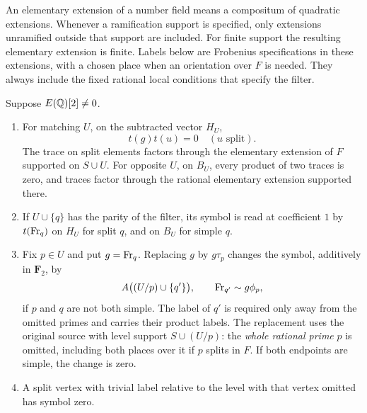 An elementary extension of a number field means a compositum of
quadratic extensions.  Whenever a ramification support is specified,
only extensions unramified outside that support are included.  For
finite support the resulting elementary extension is finite.  Labels
below are Frobenius specifications in these extensions, with a chosen
place when an orientation over $F$ is needed.  They always include the
fixed rational local conditions that specify the filter.

\begin{proposition}
\label{tc:rational-rules}
Suppose $E(\mathbb Q)[2]\ne0$.
\begin{enumerate}[label=\textup{(\roman*)}]
\item For matching $U$, on the subtracted vector $H_U$,
\[
                         t(g)t(u)=0\quad(u\text{ split}).
\]
The trace on split elements factors through the elementary extension
of $F$ supported on $S\cup U$.  For opposite $U$, on $B_U$, every
product of two traces is zero, and traces factor through the rational
elementary extension supported there.
\item If $U\cup\{q\}$ has the parity of the filter, its symbol is
read at coefficient $1$ by $t(\operatorname{Fr}_q)$ on $H_U$ for split $q$, and on
$B_U$ for simple $q$.
\item Fix $p\in U$ and put $g=\operatorname{Fr}_q$.  Replacing $g$ by $g\tau_p$
changes the symbol, additively in $\mathbf F_2$, by
\begin{equation}
                  A\bigl((U/p)\cup\{q'\}\bigr),
       \qquad \operatorname{Fr}_{q'}\sim g\phi_p,
 \label{tc:rational-contraction}
\end{equation}
if $p$ and $q$ are not both simple.  The label of $q'$ is required
only away from the omitted primes and carries their product labels.
The replacement uses the original source with level support
$S\cup(U/p)$: the \emph{whole rational prime} $p$ is omitted,
including both places over it if $p$ splits in $F$. If both endpoints
are simple, the change is zero.
\item A split vertex with trivial label relative to the level with
that vertex omitted has symbol zero.
\end{enumerate}
\end{proposition}


